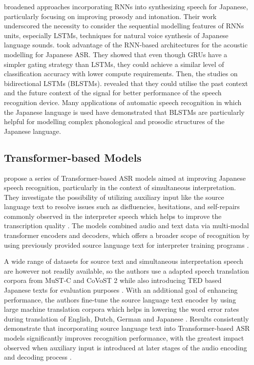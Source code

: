\textcite{Kubo2014DeepLearning} broadened approaches incorporating RNNs into synthesizing speech for Japanese, particularly focusing on improving prosody and intonation. Their work underscored the necessity to consider the sequential modelling features of RNNs units, especially LSTMs, techniques for natural voice synthesis of Japanese language sounds. \textcite{takeuchi2020real} took advantage of the RNN-based architectures for the acoustic modelling for Japanese ASR. They showed that even though GRUs have a simpler gating strategy than LSTMs, they could achieve a similar level of classification accuracy with lower compute requirements. Then, the studies on bidirectional LSTMs (BLSTMs). \textcite{imaizumi2022} revealed that they could utilise the past context and the future context of the signal for better performance of the speech recognition device. Many applications of automatic speech recognition in which the Japanese language is used have demonstrated that BLSTMs are particularly helpful for modelling complex phonological and prosodic structures of the Japanese language.


\subsection{Transformer-based Models}  
\textcite{taniguchi2022transformer} propose a series of Transformer-based ASR models aimed at improving Japanese speech recognition, particularly in the context of simultaneous interpretation. They investigate the possibility of utilizing auxiliary input like the source language text to resolve issues such as disfluencies, hesitations, and self-repairs commonly observed in the interpreter speech which helps to improve the transcription quality \parencite{Futami2020Bidirectional}. The models combined audio and text data via multi-modal transformer encoders and decoders, which offers a broader scope of recognition by using previously provided source language text for interpreter training programs \parencite{taniguchi2022transformer}.

A wide range of datasets for source text and simultaneous interpretation speech are however not readily available, so the authors use a adapted speech translation corpora from MuST-C and CoVoST 2 while also introducing TED based Japanese texts for evaluation purposes \parencite{taniguchi2022transformer}. With an additional goal of enhancing performance, the authors fine-tune the source language text encoder by using large machine translation corpora which helps in lowering the word error rates during translation of English, Dutch, German and Japanese \parencite{Taniguchi2024Pretraining}. Results consistently demonstrate that incorporating source language text into Transformer-based ASR models significantly improves recognition performance, with the greatest impact observed when auxiliary input is introduced at later stages of the audio encoding and decoding process \parencite{Futami2020Bidirectional}.

